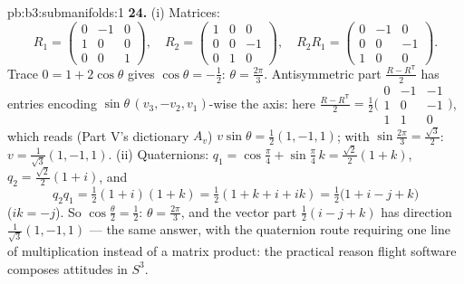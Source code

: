 \begin{solution}{pb:b3:submanifolds:1}
\textbf{24.} (i) Matrices:
\[
R_1 = \begin{pmatrix} 0 & -1 & 0\\ 1 & 0 & 0\\ 0 & 0 & 1
\end{pmatrix},
\quad
R_2 = \begin{pmatrix} 1 & 0 & 0\\ 0 & 0 & -1\\ 0 & 1 & 0
\end{pmatrix},
\quad
R_2R_1 = \begin{pmatrix} 0 & -1 & 0\\ 0 & 0 & -1\\ 1 & 0 &
0\end{pmatrix}.
\]
Trace $0 = 1 + 2\cos\theta$ gives $\cos\theta = -\frac12$:
$\theta = \frac{2\pi}3$. Antisymmetric part $\frac{R -
R^{\mathsf T}}2$ has entries encoding $\sin\theta\,(v_3,
-v_2, v_1)$-wise the axis: here $\frac{R - R^{\mathsf T}}2 =
\frac12\bigl(\begin{smallmatrix}0 & -1 & -1\\ 1 & 0 & -1\\ 1
& 1 & 0\end{smallmatrix}\bigr)$, which reads (Part V's
dictionary $A_v$) $v\sin\theta = \frac12(1, -1, 1)$; with
$\sin\frac{2\pi}3 = \frac{\sqrt3}2$: $v = \frac1{\sqrt3}(1,
-1, 1)$.
(ii) Quaternions: $q_1 = \cos\frac\pi4 + \sin\frac\pi4\,k =
\frac{\sqrt2}2(1 + k)$, $q_2 = \frac{\sqrt2}2(1 + i)$, and
\[
q_2q_1 = \tfrac12(1 + i)(1 + k) = \tfrac12(1 + k + i + ik)
= \tfrac12\bigl(1 + i - j + k\bigr)
\]
($ik = -j$). So $\cos\frac\theta2 = \frac12$: $\theta =
\frac{2\pi}3$, and the vector part $\frac12(i - j + k)$ has
direction $\frac1{\sqrt3}(1, -1, 1)$ --- the same answer,
with the quaternion route requiring one line of
multiplication instead of a matrix product: the practical
reason flight software composes attitudes in $S^3$.


\end{solution}
